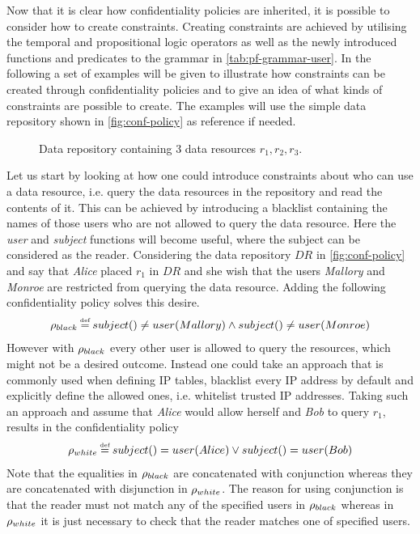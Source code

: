 Now that it is clear how confidentiality policies are inherited, it is possible to consider how to create constraints. Creating constraints are achieved by utilising the temporal and propositional logic operators as well as the newly introduced functions and predicates to the grammar in \autoref{tab:pf-grammar-user}. In the following a set of examples will be given to illustrate how constraints can be created through confidentiality policies and to give an idea of what kinds of constraints are possible to create. The examples will use the simple data repository shown in \autoref{fig:conf-policy} as reference if needed.

\begin{figure}[!ht]
    \begin{center}
        
        \caption{Data repository containing 3 data resources $r_1, r_2, r_3$.}
        \label{fig:conf-policy}
    \end{center}
\end{figure}

\begin{example}\label{ex:conf-reader-constraints}
Let us start by looking at how one could introduce constraints about who can use a data resource, i.e. query the data resources in the repository and read the contents of it. This can be achieved by introducing a blacklist containing the names of those users who are not allowed to query the data resource. Here the \emph{user} and \emph{subject} functions will become useful, where the subject can be considered as the reader. Considering the data repository $DR$ in \autoref{fig:conf-policy} and say that \emph{Alice} placed $r_1$ in $DR$ and she wish that the users \emph{Mallory} and \emph{Monroe} are restricted from querying the data resource. Adding the following confidentiality policy solves this desire.
\begin{align*}
    \conf_{black} \eqdef subject() \neq user(Mallory) \land subject() \neq user(Monroe)
\end{align*}
However with $\rho_{black}$ every other user is allowed to query the resources, which might not be a desired outcome. Instead one could take an approach that is commonly used when defining IP tables, blacklist every IP address by default and explicitly define the allowed ones, i.e. whitelist trusted IP addresses. Taking such an approach and assume that \emph{Alice} would allow herself and \emph{Bob} to query $r_1$, results in the confidentiality policy
\begin{align*}
    \conf_{white} \eqdef subject() = user(Alice) \lor subject() = user(Bob)
\end{align*}
Note that the equalities in $\rho_{black}$ are concatenated with conjunction whereas they are concatenated with disjunction in $\rho_{white}$. The reason for using conjunction is that the reader must not match any of the specified users in $\rho_{black}$ whereas in $\rho_{white}$ it is just necessary to check that the reader matches one of specified users.
\end{example}

